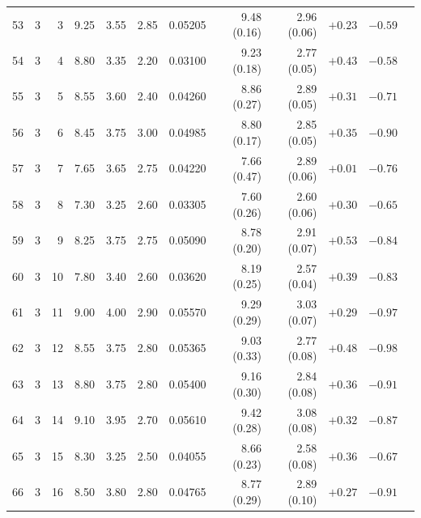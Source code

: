 \begin{longtable}{@{}rrrrrrrrrrrr@{}}
53 & 3 & 3 & \num{9.25} & \num{3.55} & \num{2.85} & \num{0.05205} & \num{9.48} (\num{0.16}) & \num{2.96} (\num{0.06}) & $+\num{0.23}$ & $-\num{0.59}$ &  \\
54 & 3 & 4 & \num{8.80} & \num{3.35} & \num{2.20} & \num{0.03100} & \num{9.23} (\num{0.18}) & \num{2.77} (\num{0.05}) & $+\num{0.43}$ & $-\num{0.58}$ &  \\
55 & 3 & 5 & \num{8.55} & \num{3.60} & \num{2.40} & \num{0.04260} & \num{8.86} (\num{0.27}) & \num{2.89} (\num{0.05}) & $+\num{0.31}$ & $-\num{0.71}$ &  \\
56 & 3 & 6 & \num{8.45} & \num{3.75} & \num{3.00} & \num{0.04985} & \num{8.80} (\num{0.17}) & \num{2.85} (\num{0.05}) & $+\num{0.35}$ & $-\num{0.90}$ &  \\
57 & 3 & 7 & \num{7.65} & \num{3.65} & \num{2.75} & \num{0.04220} & \num{7.66} (\num{0.47}) & \num{2.89} (\num{0.06}) & $+\num{0.01}$ & $-\num{0.76}$ &  \\
58 & 3 & 8 & \num{7.30} & \num{3.25} & \num{2.60} & \num{0.03305} & \num{7.60} (\num{0.26}) & \num{2.60} (\num{0.06}) & $+\num{0.30}$ & $-\num{0.65}$ &  \\
59 & 3 & 9 & \num{8.25} & \num{3.75} & \num{2.75} & \num{0.05090} & \num{8.78} (\num{0.20}) & \num{2.91} (\num{0.07}) & $+\num{0.53}$ & $-\num{0.84}$ &  \\
60 & 3 & 10 & \num{7.80} & \num{3.40} & \num{2.60} & \num{0.03620} & \num{8.19} (\num{0.25}) & \num{2.57} (\num{0.04}) & $+\num{0.39}$ & $-\num{0.83}$ &  \\
61 & 3 & 11 & \num{9.00} & \num{4.00} & \num{2.90} & \num{0.05570} & \num{9.29} (\num{0.29}) & \num{3.03} (\num{0.07}) & $+\num{0.29}$ & $-\num{0.97}$ &  \\
62 & 3 & 12 & \num{8.55} & \num{3.75} & \num{2.80} & \num{0.05365} & \num{9.03} (\num{0.33}) & \num{2.77} (\num{0.08}) & $+\num{0.48}$ & $-\num{0.98}$ &  \\
63 & 3 & 13 & \num{8.80} & \num{3.75} & \num{2.80} & \num{0.05400} & \num{9.16} (\num{0.30}) & \num{2.84} (\num{0.08}) & $+\num{0.36}$ & $-\num{0.91}$ &  \\
64 & 3 & 14 & \num{9.10} & \num{3.95} & \num{2.70} & \num{0.05610} & \num{9.42} (\num{0.28}) & \num{3.08} (\num{0.08}) & $+\num{0.32}$ & $-\num{0.87}$ &  \\
65 & 3 & 15 & \num{8.30} & \num{3.25} & \num{2.50} & \num{0.04055} & \num{8.66} (\num{0.23}) & \num{2.58} (\num{0.08}) & $+\num{0.36}$ & $-\num{0.67}$ &  \\
66 & 3 & 16 & \num{8.50} & \num{3.80} & \num{2.80} & \num{0.04765} & \num{8.77} (\num{0.29}) & \num{2.89} (\num{0.10}) & $+\num{0.27}$ & $-\num{0.91}$ &  \\

\end{longtable}
